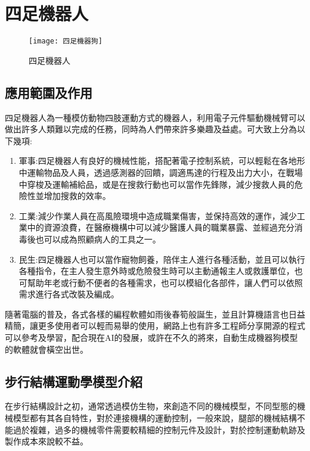 \chapter{四足機器人}
\begin{figure}[hbt!]
\begin{center}
\texttt{[image: 四足機器狗]}
\caption{\Large 四足機器人}\label{四足機器狗}
\end{center}
\end{figure}
\section{應用範圍及作用}
四足機器人為一種模仿動物四肢運動方式的機器人，利用電子元件驅動機械臂可以做出許多人類難以完成的任務，同時為人們帶來許多樂趣及益處。可大致上分為以下幾項:\\
\begin{enumerate}
\item 軍事:四足機器人有良好的機械性能，搭配著電子控制系統，可以輕鬆在各地形中運輸物品及人員，透過感測器的回饋，調適馬達的行程及出力大小，在戰場中穿梭及運輸補給品，或是在搜救行動也可以當作先鋒隊，減少搜救人員的危險性並增加搜救的效率。\\
\item 工業:減少作業人員在高風險環境中造成職業傷害，並保持高效的運作，減少工業中的資源浪費，在醫療機構中可以減少醫護人員的職業暴露、並經過充分消毒後也可以成為照顧病人的工具之一。\\
\item 民生:四足機器人也可以當作寵物飼養，陪伴主人進行各種活動，並且可以執行各種指令，在主人發生意外時或危險發生時可以主動通報主人或救護單位，也可幫助年老或行動不便者的各種需求，也可以模組化各部件，讓人們可以依照需求進行各式改裝及編成。\\
\end{enumerate}
隨著電腦的普及，各式各樣的編程軟體如雨後春筍般誕生，並且計算機語言也日益精簡，讓更多使用者可以輕而易舉的使用，網路上也有許多工程師分享開源的程式可以參考及學習，配合現在AI的發展，或許在不久的將來，自動生成機器狗模型的軟體就會橫空出世。\\[6pt]
\newpage
\section{步行結構運動學模型介紹}

在步行結構設計之初，通常透過模仿生物，來創造不同的機械模型，不同型態的機械模型都有其各自特性，對於連接機構的運動控制，一般來說，腿部的機械結構不能過於複雜，過多的機械零件需要較精細的控制元件及設計，對於控制運動軌跡及製作成本來說較不益。\\

